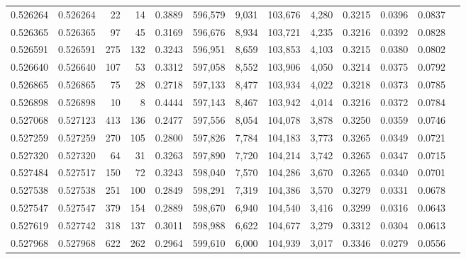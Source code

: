 \begin{tabular}{rrrrrrrrrrrrr}
0.526264 & 0.526264 &    22 &    14 &                                     0.3889 & 596,579 &   9,031 & 103,676 &   4,280 & 0.3215 & 0.0396 & 0.0837 \\
0.526365 & 0.526365 &    97 &    45 &                                     0.3169 & 596,676 &   8,934 & 103,721 &   4,235 & 0.3216 & 0.0392 & 0.0828 \\
0.526591 & 0.526591 &   275 &   132 &                                     0.3243 & 596,951 &   8,659 & 103,853 &   4,103 & 0.3215 & 0.0380 & 0.0802 \\
0.526640 & 0.526640 &   107 &    53 &                                     0.3312 & 597,058 &   8,552 & 103,906 &   4,050 & 0.3214 & 0.0375 & 0.0792 \\
0.526865 & 0.526865 &    75 &    28 &                                     0.2718 & 597,133 &   8,477 & 103,934 &   4,022 & 0.3218 & 0.0373 & 0.0785 \\
0.526898 & 0.526898 &    10 &     8 &                                     0.4444 & 597,143 &   8,467 & 103,942 &   4,014 & 0.3216 & 0.0372 & 0.0784 \\
0.527068 & 0.527123 &   413 &   136 &                                     0.2477 & 597,556 &   8,054 & 104,078 &   3,878 & 0.3250 & 0.0359 & 0.0746 \\
0.527259 & 0.527259 &   270 &   105 &                                     0.2800 & 597,826 &   7,784 & 104,183 &   3,773 & 0.3265 & 0.0349 & 0.0721 \\
0.527320 & 0.527320 &    64 &    31 &                                     0.3263 & 597,890 &   7,720 & 104,214 &   3,742 & 0.3265 & 0.0347 & 0.0715 \\
0.527484 & 0.527517 &   150 &    72 &                                     0.3243 & 598,040 &   7,570 & 104,286 &   3,670 & 0.3265 & 0.0340 & 0.0701 \\
0.527538 & 0.527538 &   251 &   100 &                                     0.2849 & 598,291 &   7,319 & 104,386 &   3,570 & 0.3279 & 0.0331 & 0.0678 \\
0.527547 & 0.527547 &   379 &   154 &                                     0.2889 & 598,670 &   6,940 & 104,540 &   3,416 & 0.3299 & 0.0316 & 0.0643 \\
0.527619 & 0.527742 &   318 &   137 &                                     0.3011 & 598,988 &   6,622 & 104,677 &   3,279 & 0.3312 & 0.0304 & 0.0613 \\
0.527968 & 0.527968 &   622 &   262 &                                     0.2964 & 599,610 &   6,000 & 104,939 &   3,017 & 0.3346 & 0.0279 & 0.0556 \\

\end{tabular}

